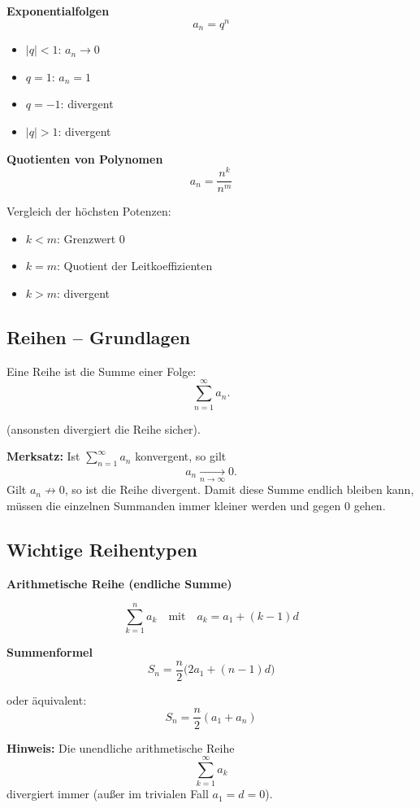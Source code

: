 \documentclass[../zusammenfassung_AN.tex]{subfiles}
\begin{document}
	\textbf{Exponentialfolgen}
	\[
	a_n = q^n
	\]
	
	\begin{itemize}
		\item $|q|<1$: $a_n \to 0$
		\item $q=1$: $a_n = 1$
		\item $q=-1$: divergent
		\item $|q|>1$: divergent
	\end{itemize}
	
	\textbf{Quotienten von Polynomen}
	\[
	a_n = \frac{n^k}{n^m}
	\]
	
	Vergleich der höchsten Potenzen:
	\begin{itemize}
		\item $k<m$: Grenzwert $0$
		\item $k=m$: Quotient der Leitkoeffizienten
		\item $k>m$: divergent
	\end{itemize}
	
	\subsection{Reihen – Grundlagen}
	
	Eine Reihe ist die Summe einer Folge:
	\[
	\sum_{n=1}^{\infty} a_n.
	\]
	
	(ansonsten divergiert die Reihe sicher).
	
	\textbf{Merksatz:}  
	Ist $\displaystyle \sum_{n=1}^{\infty} a_n$ konvergent, so gilt
	\[
	a_n \xrightarrow[n\to\infty]{} 0.
	\]
	Gilt $a_n \not\to 0$, so ist die Reihe divergent. Damit diese Summe endlich bleiben kann, müssen die einzelnen Summanden immer kleiner werden und gegen 0 gehen.
	
	
	\subsection{Wichtige Reihentypen}
	
	\textbf{Arithmetische Reihe (endliche Summe)}
	
	\[
	\sum_{k=1}^{n} a_k
	\quad \text{mit} \quad
	a_k = a_1 + (k-1)d
	\]
	
	\textbf{Summenformel}
	\[
	S_n = \frac{n}{2}\bigl(2a_1 + (n-1)d\bigr)
	\]
	
	oder äquivalent:
	\[
	S_n = \frac{n}{2}(a_1 + a_n)
	\]
	
	\textbf{Hinweis:}
	Die unendliche arithmetische Reihe
	\[
	\sum_{k=1}^{\infty} a_k
	\]
	divergiert immer (außer im trivialen Fall $a_1 = d = 0$).
	
\end{document}
